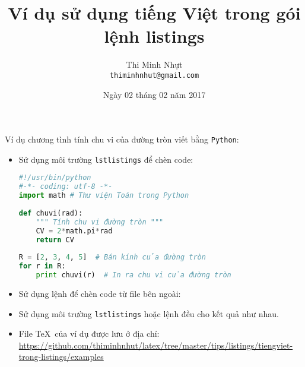 \documentclass[12pt, a4paper]{article}
\title{\bfseries Ví dụ sử dụng tiếng Việt trong gói lệnh listings}
\author{Thi Minh Nhựt \bigskip \\ \tt{thiminhnhut@gmail.com}}
\date{Ngày 02 tháng 02 năm 2017}
\begin{document}
\maketitle

Ví dụ chương tình tính chu vi của đường tròn viết bằng \verb|Python|:
\begin{itemize}
	\item Sử dụng môi trường \verb|lstlistings| để chèn code:
\begin{lstlisting}[language=Python]
#!/usr/bin/python
#-*- coding: utf-8 -*-
import math # Thư viện Toán trong Python
  
def chuvi(rad):
	""" Tính chu vi đường tròn """
	CV = 2*math.pi*rad
	return CV
  	
R = [2, 3, 4, 5]  # Bán kính của đường tròn   
for r in R:
	print chuvi(r)	# In ra chu vi của đường tròn
\end{lstlisting}

	\item Sử dụng lệnh \verb|| để chèn code từ file bên ngoài: 
	
	\item Sử dụng môi trường \verb|lstlistings| hoặc lệnh \verb|| đều cho kết quả như nhau.
	
	\item File \TeX\ của ví dụ được lưu ở địa chỉ: \url{https://github.com/thiminhnhut/latex/tree/master/tips/listings/tiengviet-trong-listings/examples}
\end{itemize}
\end{document}
